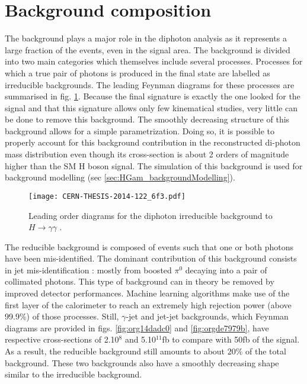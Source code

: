 \section{Background composition}
\label{sec:orge71ce2c}
\label{sec:HGam_backgroundCompo}
The background plays a major role in the diphoton analysis as it represents a large fraction of the  events, even in the signal area.
The background is divided into two main categories which themselves include several processes.
Processes for which a true pair of photons is produced in the final state are labelled as irreducible backgrounds.
The leading Feynman diagrams for these processes are summarised in fig. \ref{fig:orgf543782}.
Because the final signature is exactly the one looked for the signal and that this signature allows only few kinematical studies, very little can be done to remove this background.
The smoothly decreasing structure of this background allows for a simple parametrization.
Doing so, it is possible to properly account for this background contribution in the reconstructed di-photon mass distribution even though its cross-section is about 2 orders of magnitude higher than the SM H boson signal.
The simulation of this background is used for background modelling (sec \ref{sec:HGam_backgroundModelling}).

\begin{figure}[htbp]
\centering
\texttt{[image: CERN-THESIS-2014-122\_6f3.pdf]}
\caption{\label{fig:orgf543782}
Leading order diagrams for the diphoton irreducible background to $H\rightarrow\gamma\gamma$ \cite{CERN-THESIS-2014-122}.}
\end{figure}

The reducible background is composed of events such that one or both photons have been mis-identified.
The dominant contribution of this background consists in jet  mis-identification : mostly from boosted \(\pi^{\text{0}}\) decaying into a pair of collimated photons.
This type of background can in theory be removed by improved detector performances.
Machine learning algorithms make use of the first layer of the calorimeter to reach an extremely high rejection power (above 99.9\%) of those processes.
Still, \(\gamma\)-jet and jet-jet backgrounds, which Feynman diagrams are provided in figs. \ref{fig:org14dadc0} and \ref{fig:orgde7979b}, have respective cross-sections of 2.10\(^{\text{8}}\) and 5.10\(^{\text{11}}\)fb to compare with 50fb of the signal.
As a result, the reducible background still amounts to about 20\% of the total background.
These two backgrounds also have a smoothly decreasing shape similar to the irreducible background.

